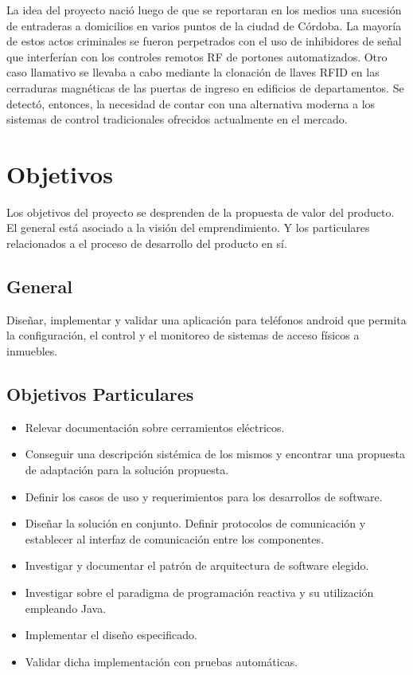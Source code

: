 La idea del proyecto nació luego de que se reportaran en los medios una sucesión de entraderas a domicilios en varios puntos de la ciudad de Córdoba. La mayoría de estos actos criminales se fueron perpetrados con el uso de inhibidores de señal que interferían con los controles remotos RF de portones automatizados. Otro caso llamativo se llevaba a cabo mediante la clonación de llaves RFID en las cerraduras magnéticas de las puertas de ingreso en edificios de departamentos. Se detectó, entonces, la necesidad de contar con una alternativa moderna a los sistemas de control tradicionales ofrecidos actualmente en el mercado.

\section{Objetivos}
Los objetivos del proyecto se desprenden de la propuesta de valor del producto. El general está asociado a la visión del emprendimiento.
Y los particulares relacionados a el proceso de desarrollo del producto en sí.
\subsection{General}
Diseñar, implementar y validar una aplicación para teléfonos android que permita la configuración, el control y el monitoreo de sistemas de acceso físicos a inmuebles. 

\subsection{Objetivos Particulares}

\begin{itemize}
	\item Relevar documentación sobre cerramientos eléctricos.
	\item Conseguir una descripción sistémica de los mismos y encontrar una propuesta de adaptación para la solución propuesta.
	\item Definir los casos de uso y requerimientos para los desarrollos de software.
	\item Diseñar la solución en conjunto. Definir protocolos de comunicación y establecer al interfaz de comunicación entre los componentes.
	\item Investigar y documentar el patrón de arquitectura de software elegido.
	\item Investigar sobre el paradigma de programación reactiva y su utilización empleando Java.
	\item Implementar el diseño especificado.
	\item Validar dicha implementación con pruebas automáticas.
\end{itemize}

